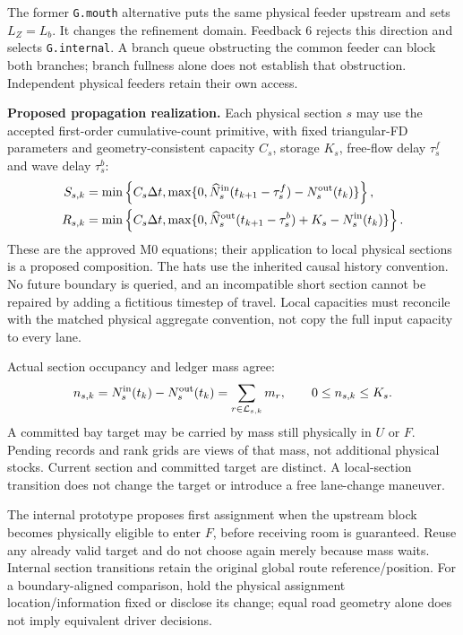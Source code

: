 \documentclass[11pt]{article}
\newcommand{\pos}[1]{\max\{0,#1\}}
\begin{document}
The former \texttt{G.mouth} alternative puts the same physical feeder upstream and sets $L_Z=L_b$. It changes the refinement domain. Feedback 6 rejects this direction and selects \texttt{G.internal}. A branch queue obstructing the common feeder can block both branches; branch fullness alone does not establish that obstruction. Independent physical feeders retain their own access.

\textbf{Proposed propagation realization.} Each physical section $s$ may use the accepted first-order cumulative-count primitive, with fixed triangular-FD parameters and geometry-consistent capacity $C_s$, storage $K_s$, free-flow delay $\tau^f_s$ and wave delay $\tau^b_s$:
\begin{align}
 S_{s,k}&=\min\left\{C_s\Delta t,
    \pos{\widehat N^{\rm in}_s(t_{k+1}-\tau^f_s)-N^{\rm out}_s(t_k)}\right\},\\
 R_{s,k}&=\min\left\{C_s\Delta t,
    \pos{\widehat N^{\rm out}_s(t_{k+1}-\tau^b_s)+K_s-N^{\rm in}_s(t_k)}\right\}.
\end{align}
These are the approved M0 equations; their application to local physical sections is a proposed composition. The hats use the inherited causal history convention. No future boundary is queried, and an incompatible short section cannot be repaired by adding a fictitious timestep of travel. Local capacities must reconcile with the matched physical aggregate convention, not copy the full input capacity to every lane.

Actual section occupancy and ledger mass agree:
\begin{equation}
 n_{s,k}=N_s^{\rm in}(t_k)-N_s^{\rm out}(t_k)
       =\sum_{r\in\mathcal L_{s,k}}m_r,\qquad 0\le n_{s,k}\le K_s.
\end{equation}
A committed bay target may be carried by mass still physically in $U$ or $F$. Pending records and rank grids are views of that mass, not additional physical stocks. Current section and committed target are distinct. A local-section transition does not change the target or introduce a free lane-change maneuver.

The internal prototype proposes first assignment when the upstream block becomes physically eligible to enter $F$, before receiving room is guaranteed. Reuse any already valid target and do not choose again merely because mass waits. Internal section transitions retain the original global route reference/position. For a boundary-aligned comparison, hold the physical assignment location/information fixed or disclose its change; equal road geometry alone does not imply equivalent driver decisions.
\end{document}
